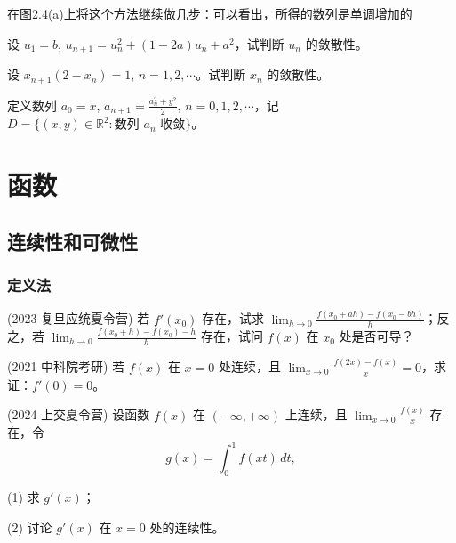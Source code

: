 \documentclass[lang=cn,10pt,thmcnt=section]{elegantbook}
\begin{document}
在图2.4(a)上将这个方法继续做几步：可以看出，所得的数列是单调增加的

\begin{example}
	设 \( u_1 = b \), \( u_{n+1} = u_n^2 + (1 - 2a)u_n + a^2 \)，试判断 \( u_n \) 的敛散性。
\end{example}

\begin{example}
	设 \( x_{n+1}(2 - x_n) = 1 \), \( n = 1, 2, \cdots \)。试判断 \( x_n \) 的敛散性。
\end{example}

\begin{example}
	定义数列 \( a_0 = x \), \( a_{n+1} = \frac{a_n^2 + y^2}{2} \), \( n = 0, 1, 2, \cdots \)，记 \( D = \{(x, y) \in \mathbb{R}^2 : \text{数列 } a_n \text{ 收敛}\} \)。
\end{example}
\chapter{函数}
\section{连续性和可微性}
\subsection{定义法}
\begin{example}
	(2023 复旦应统夏令营) 若 \( f'(x_0) \) 存在，试求 \(\lim_{h \to 0} \frac{f(x_0 + ah) - f(x_0 - bh)}{h}\)；反之，若 \(\lim_{h \to 0} \frac{f(x_0 + h) - f(x_0) - h}{h}\) 存在，试问 \( f(x) \) 在 \( x_0 \) 处是否可导？
\end{example}
\begin{example}
	(2021 中科院考研) 若 \( f(x) \) 在 \( x = 0 \) 处连续，且 \(\lim_{x \to 0} \frac{f(2x) - f(x)}{x} = 0\)，求证：\( f'(0) = 0 \)。
\end{example}
\begin{example}
	(2024 上交夏令营) 设函数 \( f(x) \) 在 \((-\infty, +\infty)\) 上连续，且 \(\lim_{x \to 0} \frac{f(x)}{x}\) 存在，令  
\[g(x) = \int_0^1 f(xt) \, dt,\]

(1) 求 \( g'(x) \)；  

(2) 讨论 \( g'(x) \) 在 \( x=0 \) 处的连续性。
\end{example}
\end{document}
